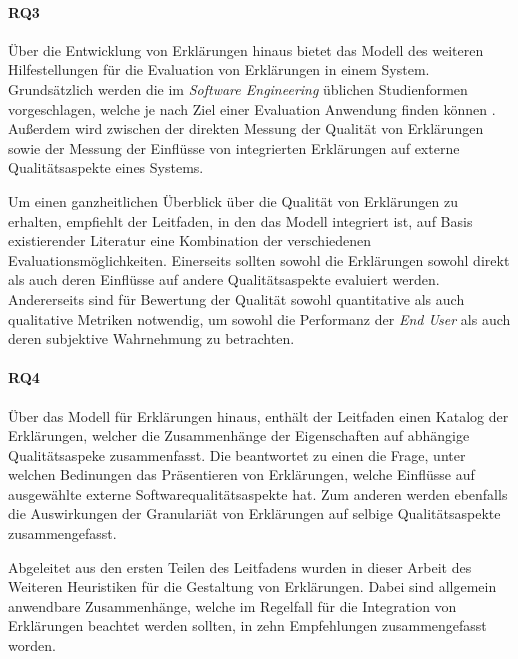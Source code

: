 \paragraph{RQ3} Über die Entwicklung von Erklärungen hinaus bietet das Modell des weiteren Hilfestellungen für die Evaluation von Erklärungen in einem System. Grundsätzlich werden die im \textit{Software Engineering} üblichen Studienformen vorgeschlagen, welche je nach Ziel einer Evaluation Anwendung finden können \cite[vgl.][]{wohlin2012experimentation}. Außerdem wird zwischen der direkten Messung der Qualität von Erklärungen sowie der Messung der Einflüsse von integrierten Erklärungen auf externe Qualitätsaspekte eines Systems.

Um einen ganzheitlichen Überblick über die Qualität von Erklärungen zu erhalten, empfiehlt der Leitfaden, in den das Modell integriert ist, auf Basis existierender Literatur eine Kombination der verschiedenen Evaluationsmöglichkeiten. Einerseits sollten sowohl die Erklärungen sowohl direkt als auch deren Einflüsse auf andere Qualitätsaspekte evaluiert werden. Andererseits sind für Bewertung der Qualität sowohl quantitative als auch qualitative Metriken notwendig, um sowohl die Performanz der \textit{End User} als auch deren subjektive Wahrnehmung zu betrachten.

\paragraph{RQ4} Über das Modell für Erklärungen hinaus, enthält der Leitfaden einen Katalog der Erklärungen, welcher die Zusammenhänge der Eigenschaften auf abhängige Qualitätsaspeke zusammenfasst. Die beantwortet zu einen die Frage, unter welchen Bedinungen das Präsentieren von Erklärungen, welche Einflüsse auf ausgewählte externe Softwarequalitätsaspekte hat. Zum anderen werden ebenfalls die Auswirkungen der Granulariät von Erklärungen auf selbige Qualitätsaspekte zusammengefasst.

\bigskip

Abgeleitet aus den ersten Teilen des Leitfadens wurden in dieser Arbeit des Weiteren Heuristiken für die Gestaltung von Erklärungen. Dabei sind allgemein anwendbare Zusammenhänge, welche im Regelfall für die Integration von Erklärungen beachtet werden sollten, in zehn Empfehlungen zusammengefasst worden.

\bigskip

